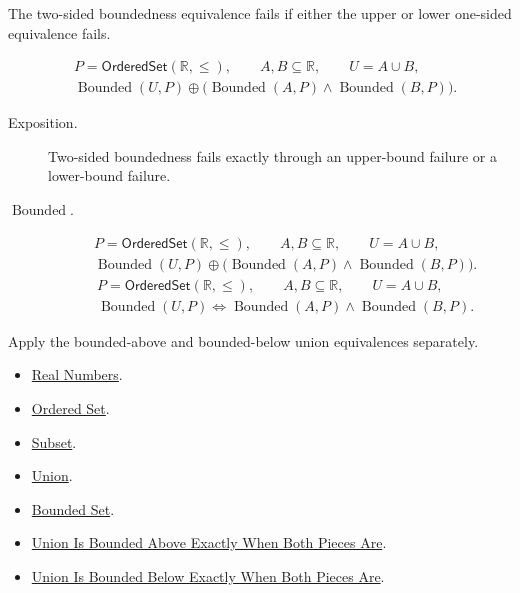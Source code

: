 \begin{remark*}
The two-sided boundedness equivalence fails if either the upper or lower
one-sided equivalence fails.
\end{remark*}

\begin{remark*}
\[
\begin{aligned}
&P=\mathsf{OrderedSet}(\mathbb{R},\leq),\qquad A,B\subseteq\mathbb{R},\qquad U=A\cup B,\\
&\operatorname{Bounded}(U,P)\oplus
\bigl(\operatorname{Bounded}(A,P)\land\operatorname{Bounded}(B,P)\bigr).
\end{aligned}
\]
\end{remark*}

\begin{remark*}
\begin{description}
\item[Exposition.]
Two-sided boundedness fails exactly through an upper-bound failure or a
lower-bound failure.


  \item[\(\operatorname{Bounded}.\)]

\[
\begin{aligned}
&P=\mathsf{OrderedSet}(\mathbb{R},\leq),\qquad A,B\subseteq\mathbb{R},\qquad U=A\cup B,\\
&\operatorname{Bounded}(U,P)\oplus
\bigl(\operatorname{Bounded}(A,P)\land\operatorname{Bounded}(B,P)\bigr).
\end{aligned}
\]
\[
\begin{aligned}
&P=\mathsf{OrderedSet}(\mathbb{R},\leq),\qquad A,B\subseteq\mathbb{R},\qquad U=A\cup B,\\
&\operatorname{Bounded}(U,P)
\Longleftrightarrow
\operatorname{Bounded}(A,P)\land\operatorname{Bounded}(B,P).
\end{aligned}
\]
\end{description}
\end{remark*}

\begin{remark*}[Interpretation]
Apply the bounded-above and bounded-below union equivalences separately.
\end{remark*}

\begin{dependencies}
\begin{itemize}
\item \hyperref[def:reals]{Real Numbers}.
\item \hyperref[def:ordered-set]{Ordered Set}.
\item \hyperref[def:subset]{Subset}.
\item \hyperref[def:union]{Union}.
\item \hyperref[def:bounded]{Bounded Set}.
\item \hyperref[prop:union-bounded-above-iff-pieces-bounded-above]{Union Is Bounded Above Exactly When Both Pieces Are}.
\item \hyperref[prop:union-bounded-below-iff-pieces-bounded-below]{Union Is Bounded Below Exactly When Both Pieces Are}.
\end{itemize}
\end{dependencies}


